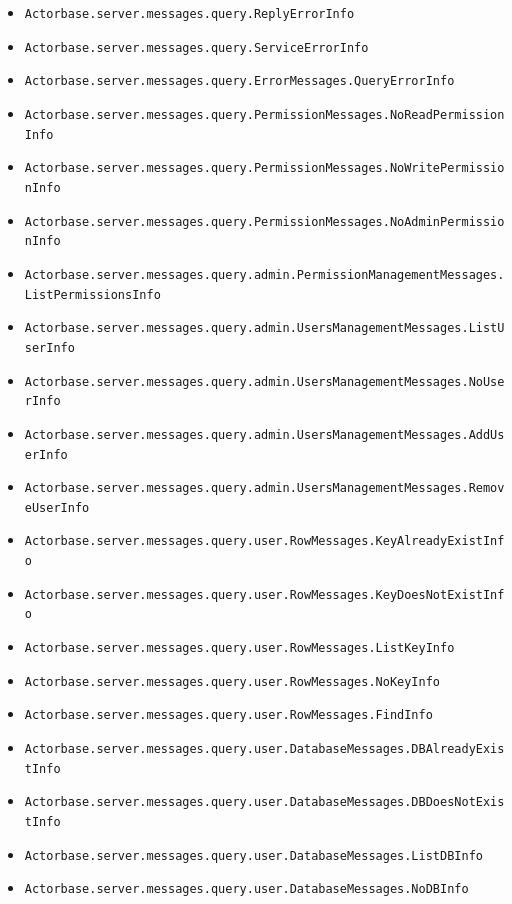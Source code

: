 \documentclass[a4paper]{article}
\begin{document}
			\begin{itemize}
				\item \texttt{Actorbase.server.messages.query.ReplyErrorInfo }
				\item \texttt{Actorbase.server.messages.query.ServiceErrorInfo }
				\item \texttt{Actorbase.server.messages.query.ErrorMessages.QueryErrorInfo }
				\item \texttt{Actorbase.server.messages.query.PermissionMessages.NoReadPermissionInfo }
  				\item \texttt{Actorbase.server.messages.query.PermissionMessages.NoWritePermissionInfo }
  				\item \texttt{Actorbase.server.messages.query.PermissionMessages.NoAdminPermissionInfo }
  				\item \texttt{Actorbase.server.messages.query.admin.PermissionManagementMessages.ListPermissionsInfo }
  				\item \texttt{Actorbase.server.messages.query.admin.UsersManagementMessages.ListUserInfo }
  				\item \texttt{Actorbase.server.messages.query.admin.UsersManagementMessages.NoUserInfo }
  				\item \texttt{Actorbase.server.messages.query.admin.UsersManagementMessages.AddUserInfo }
  				\item \texttt{Actorbase.server.messages.query.admin.UsersManagementMessages.RemoveUserInfo }
  				\item \texttt{Actorbase.server.messages.query.user.RowMessages.KeyAlreadyExistInfo }
  				\item \texttt{Actorbase.server.messages.query.user.RowMessages.KeyDoesNotExistInfo }
  				\item \texttt{Actorbase.server.messages.query.user.RowMessages.ListKeyInfo }
  				\item \texttt{Actorbase.server.messages.query.user.RowMessages.NoKeyInfo }
  				\item \texttt{Actorbase.server.messages.query.user.RowMessages.FindInfo }
  				\item \texttt{Actorbase.server.messages.query.user.DatabaseMessages.DBAlreadyExistInfo }
  				\item \texttt{Actorbase.server.messages.query.user.DatabaseMessages.DBDoesNotExistInfo }
  				\item \texttt{Actorbase.server.messages.query.user.DatabaseMessages.ListDBInfo }
  				\item \texttt{Actorbase.server.messages.query.user.DatabaseMessages.NoDBInfo }

\end{itemize}
\end{document}
